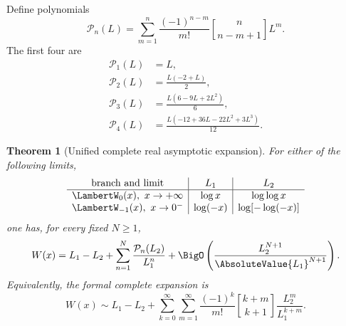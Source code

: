 \documentclass[11pt]{article}
\newtheorem{theorem}{Theorem}[section]
\theoremstyle{remark}
\newcommand{\Wz}{\LambertW_{0}}
\newcommand{\Wm}{\LambertW_{-1}}
\newcommand{\stirling}[2]{\genfrac{[}{]}{0pt}{}{#1}{#2}}
\begin{document}
Define polynomials
\begin{equation}\label{eq:Pn-asym}
 \mathcal P_n(L)
 =\sum_{m=1}^n
   \frac{(-1)^{n-m}}{m!}
   \stirling{n}{n-m+1}L^m.
\end{equation}
The first four are
\begin{align}
 \mathcal P_1(L)&=L,\label{eq:P1}\\
 \mathcal P_2(L)&=\frac{L(-2+L)}2,\label{eq:P2}\\
 \mathcal P_3(L)&=\frac{L(6-9L+2L^2)}6,\label{eq:P3}\\
 \mathcal P_4(L)&=\frac{L(-12+36L-22L^2+3L^3)}{12}.
 \label{eq:P4}
\end{align}

\begin{theorem}[Unified complete real asymptotic expansion]\label{thm:fullasym}
For either of the following limits,
\[
 \begin{array}{c|c|c}
 \text{branch and limit}&L_1&L_2\\ \hline
 \Wz(x),\ x\to+\infty&\log x&\log\log x\\
 \Wm(x),\ x\to0^-&\log(-x)&\log[-\log(-x)]
 \end{array}
\]
one has, for every fixed \(N\geq1\),
\begin{equation}\label{eq:fullasym}
 W(x)=L_1-L_2+
 \sum_{n=1}^{N}\frac{\mathcal P_n(L_2)}{L_1^n}
 +\BigO\left(
 \frac{L_2^{N+1}}{\AbsoluteValue{L_1}^{N+1}}
 \right).
\end{equation}
Equivalently, the formal complete expansion is
\begin{equation}\label{eq:doubleasym}
 W(x)\sim L_1-L_2+
 \sum_{k=0}^{\infty}\sum_{m=1}^{\infty}
 \frac{(-1)^k}{m!}
 \stirling{k+m}{k+1}
 \frac{L_2^m}{L_1^{k+m}}.
\end{equation}
\end{theorem}
\end{document}
